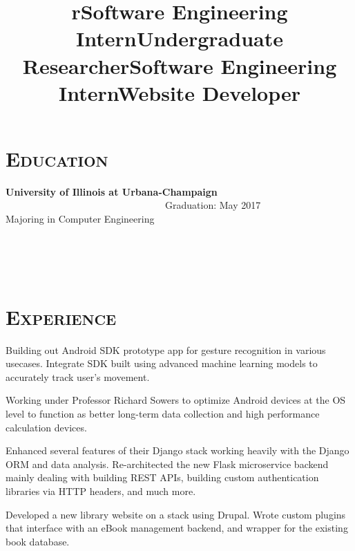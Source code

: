 \begin{resume}
\section{\textsc{Education}}
\textbf{University of Illinois at Urbana-Champaign} \ \ \ \ \ \ \ \ \ \ \ \ \ \ \ \ \ \ \ \ \ \ \ \ \ \ \ \ \ \ \ \ \ Graduation: May 2017 \\
Majoring in Computer Engineering
\begin{formatb}
  \title{r}\\
  \\
  \body\\
\end{formatb}

\section{\textsc{Experience}}

\title{Software Engineering Intern}
\begin{position}
Building out Android SDK prototype app for gesture recognition in various usecases. Integrate SDK built using advanced machine learning models to accurately track user's movement.
\end{position}

\title{Undergraduate Researcher}
\begin{position}
Working under Professor Richard Sowers to optimize Android devices at the OS level to function as better long-term data collection and high performance calculation devices.
\end{position}

\title{Software Engineering Intern}
\begin{position}
Enhanced several features of their Django stack working heavily with the Django ORM and data analysis. Re-architected the new Flask microservice backend mainly dealing with building REST APIs, building custom authentication libraries via HTTP headers, and much more.
\end{position}

\title{Website Developer}
\begin{position}
Developed a new library website on a stack using Drupal. Wrote custom plugins that interface with an eBook management backend, and wrapper for the existing book database.
\end{position}


\end{resume}
